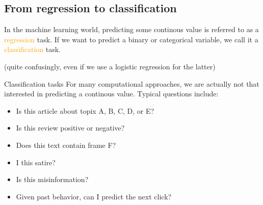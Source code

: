 \documentclass[compress]{beamer}
\begin{document}
\subsection{From regression to classification}
	
\begin{frame}[standout]
In the machine learning world, predicting some continous value is referred to as a \textcolor{orange}{regression} task. If we want to predict a binary or categorical variable, we call it a \textcolor{orange}{classification} task.

(quite confusingly, even if we use a logistic regression for the latter)
\end{frame}


\begin{frame}{Classification tasks}
For many computational approaches, we are actually not that interested in predicting a continous value. Typical questions include:
\begin{itemize}
	\item Is this article about topix A, B, C, D, or E?
	\item Is this review positive or negative?
	\item Does this text contain frame F?
	\item I this satire? 
	\item Is this misinformation?
	\item Given past behavior, can I predict the next click?
\end{itemize}
\end{frame}
\end{document}
